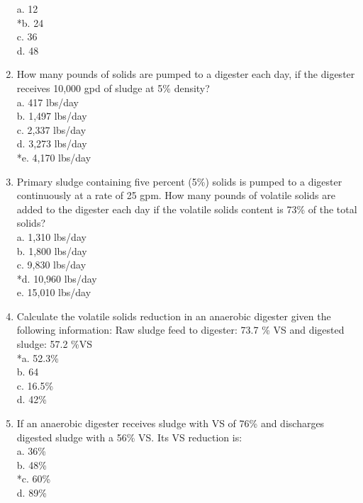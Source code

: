 \documentclass{article}
\begin{document}
\begin{enumerate}
a. 12 \\
*b. 24 \\
c. 36 \\
d. 48 \\

\item  How many pounds of solids are pumped to a digester each day, if the digester receives 10,000 gpd of sludge at 5\% density? \\

a. 417 lbs/day \\
b. 1,497 lbs/day \\
c. 2,337 lbs/day \\
d. 3,273 lbs/day \\
*e. 4,170 lbs/day \\

\item  Primary sludge containing five percent (5\%) solids is pumped to a digester continuously at a rate of 25 gpm. How many pounds of volatile solids are added to the digester each day if the volatile solids content is 73\% of the total solids? \\

a. 1,310 lbs/day \\
b. 1,800 lbs/day \\
c. 9,830 lbs/day \\
*d. 10,960 lbs/day \\
e. 15,010 lbs/day \\

\item  Calculate the volatile solids reduction in an anaerobic digester given the following information:  Raw sludge feed to digester:  73.7 \% VS and digested sludge: 57.2 \%VS \\

*a. 52.3\% \\
b. 64 \\
c. 16.5\% \\
d. 42\% \\

\item  If an anaerobic digester receives sludge with VS of 76\% and discharges digested sludge with a 56\% VS.  Its VS reduction is: \\

a. 36\% \\
b. 48\% \\
*c. 60\% \\
d. 89\% \\


\end{enumerate}
\end{document}
